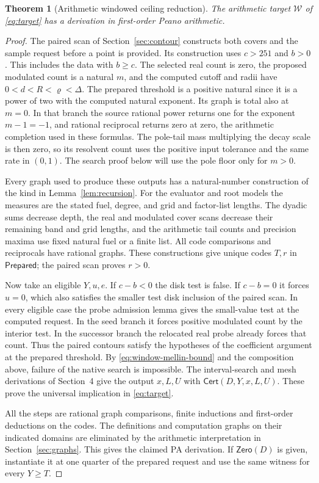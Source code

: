 \documentclass[11pt]{amsart}
\newtheorem{theorem}{Theorem}[section]
\theoremstyle{definition}
\theoremstyle{remark}
\numberwithin{equation}{section}
\newcommand{\Zero}{\mathsf{Zero}}
\newcommand{\Cert}{\mathsf{Cert}}
\begin{document}
\begin{theorem}[Arithmetic windowed ceiling reduction]
\label{thm:pa-window}
The arithmetic target \(\mathcal W\) of \eqref{eq:target}
has a derivation in first-order Peano arithmetic.
\end{theorem}
\begin{proof}
The paired scan of Section~\ref{sec:contour} constructs
both covers and the sample request before a point is
provided. Its construction uses \(c>251\) and \(b>0\).
This includes the data with \(b\ge c\).
The selected real count is zero, the proposed modulated
count is a natural \(m\), and the computed cutoff and radii
have \(0<d<R<\varrho<\Delta\).
The prepared threshold is a positive natural since it
is a power of two with the computed natural exponent.
Its graph is total also at \(m=0\). In that branch the
source rational power returns one for the exponent
\(m-1=-1\), and rational reciprocal returns zero at zero,
the arithmetic completion used in these formulas.
The pole-tail mass multiplying the decay scale is then
zero, so its resolvent count uses the positive input
tolerance and the same rate in \((0,1)\).
The search proof below will use the pole floor only for
\(m>0\).

Every graph used to produce these outputs has a
natural-number construction of the kind in
Lemma~\ref{lem:recursion}. For the evaluator and root
models the measures are the stated fuel, degree, and
grid and factor-list lengths. The dyadic sums decrease
depth, the real and modulated cover scans decrease their
remaining band and grid lengths, and the arithmetic
tail counts and precision maxima use fixed natural
fuel or a finite list. All code comparisons and
reciprocals have rational graphs. These constructions
give unique codes \(T,r\) in \(\mathsf{Prepared}\);
the paired scan proves \(r>0\).

Now take an eligible \(Y,u,e\).
If \(c-b<0\) the disk test is false. If \(c-b=0\)
it forces \(u=0\), which also satisfies the smaller
test disk inclusion of the paired scan. In every
eligible case the probe admission lemma gives the
small-value test at the computed request.
In the seed branch it forces positive modulated
count by the interior test. In the successor branch
the relocated real probe already forces that count.
Thus the paired contours satisfy the hypotheses of
the coefficient argument at the prepared threshold.
By \eqref{eq:window-mellin-bound} and the composition
above, failure of the native search is impossible.
The interval-search and mesh derivations of
Section~4 give the output \(x,L,U\) with
\(\Cert(D,Y,x,L,U)\). These prove the universal
implication in \eqref{eq:target}.

All the steps are rational graph comparisons, finite
inductions and first-order deductions on the codes.
The definitions and computation graphs on their
indicated domains are eliminated by the arithmetic
interpretation in Section~\ref{sec:graphs}.
This gives the claimed PA derivation. If
\(\Zero(D)\) is given, instantiate it at one quarter
of the prepared request and use the same witness
for every \(Y\ge T\).
\end{proof}
\end{document}
